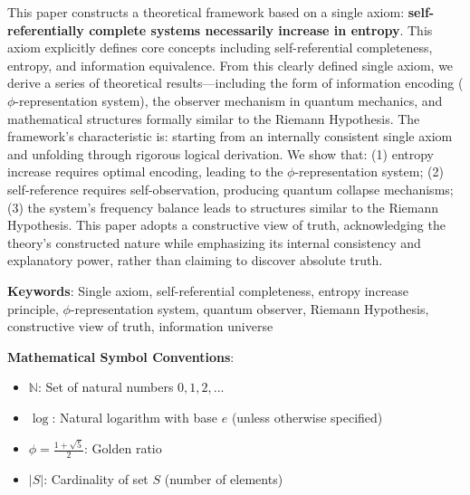 
This paper constructs a theoretical framework based on a single axiom: \textbf{self-referentially complete systems necessarily increase in entropy}. This axiom explicitly defines core concepts including self-referential completeness, entropy, and information equivalence. From this clearly defined single axiom, we derive a series of theoretical results---including the form of information encoding ($\phi$-representation system), the observer mechanism in quantum mechanics, and mathematical structures formally similar to the Riemann Hypothesis. The framework's characteristic is: starting from an internally consistent single axiom and unfolding through rigorous logical derivation. We show that: (1) entropy increase requires optimal encoding, leading to the $\phi$-representation system; (2) self-reference requires self-observation, producing quantum collapse mechanisms; (3) the system's frequency balance leads to structures similar to the Riemann Hypothesis. This paper adopts a constructive view of truth, acknowledging the theory's constructed nature while emphasizing its internal consistency and explanatory power, rather than claiming to discover absolute truth.

\textbf{Keywords}: Single axiom, self-referential completeness, entropy increase principle, $\phi$-representation system, quantum observer, Riemann Hypothesis, constructive view of truth, information universe

\textbf{Mathematical Symbol Conventions}:
\begin{itemize}
\item $\mathbb{N}$: Set of natural numbers ${0, 1, 2, ...}$
\item $\log$: Natural logarithm with base $e$ (unless otherwise specified)
\item $\phi = \frac{1+\sqrt{5}}{2}$: Golden ratio
\item $|S|$: Cardinality of set $S$ (number of elements)
\end{itemize}

